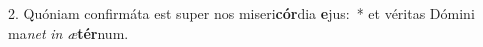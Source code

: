 2. Quóniam confirmáta est super nos miseri\textbf{cór}dia \textbf{e}jus:~*  et véritas Dómini ma\textit{net} \textit{in} \textit{æ}\textbf{tér}num.\

